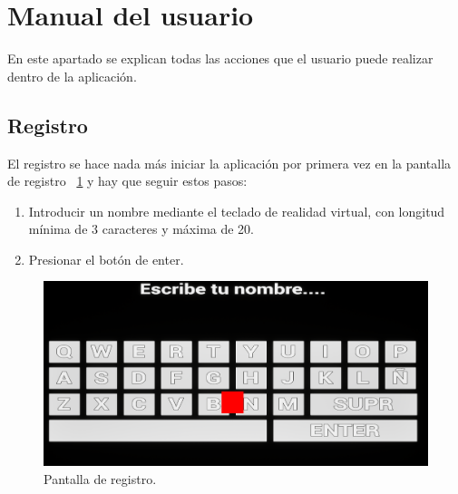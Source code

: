 \section{Manual del usuario}
En este apartado se explican todas las acciones que el usuario puede realizar dentro de la aplicación.

\subsection{Registro}
El registro se hace nada más iniciar la aplicación por primera vez en la pantalla de registro ~\ref{b:pantalla_registro} y hay que seguir estos pasos:
\begin{enumerate}
    \item Introducir un nombre mediante el teclado de realidad virtual, con longitud mínima de 3 caracteres y máxima de 20.
    \item Presionar el botón de enter.
\end{enumerate}
\begin{figure}[h]
	\centering
	\includegraphics[width=\textwidth]{../img/anexos/Pantalla_De_Registro.png}
    \caption[Pantalla de registro]{Pantalla de registro.}
	\label{b:pantalla_registro}
\end{figure}

